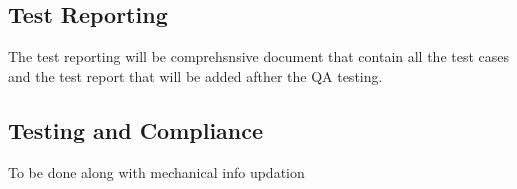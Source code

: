 \documentclass[a4paper,12pt]{article}
\begin{document}
	\subsection{Test Reporting}
	
	The test reporting will be comprehsnsive document that contain all the test cases and the test report that will be added afther the QA testing.
	
	\subsection{Testing and Compliance}
	To be done along with mechanical info updation
\end{document}
